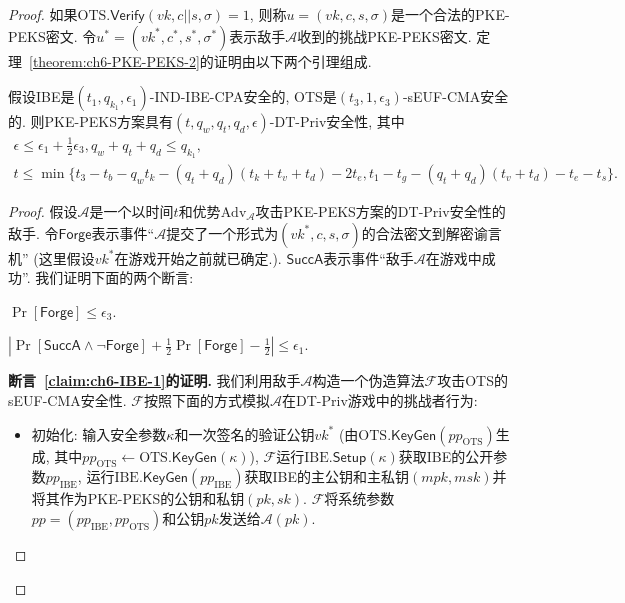 \begin{proof}
如果$\text{OTS}.\mathsf{Verify}(vk, c||s, \sigma) = 1$, 则称$u = (vk, c, s, \sigma)$是一个合法的PKE-PEKS密文. 令$u^* = (vk^*, c^*, s^*, \sigma^*)$表示敌手$\mathcal{A}$收到的挑战PKE-PEKS密文. 定理~\ref{theorem:ch6-PKE-PEKS-2}的证明由以下两个引理组成.
\begin{lemma}\label{lemma:ch6-IBE-1}
假设IBE是$(t_1, q_{k_1}, \epsilon_1)$-IND-IBE-CPA安全的, OTS是$(t_3, 1, \epsilon_3)$-sEUF-CMA安全的. 则PKE-PEKS方案具有$(t, q_w, q_t, q_d, \epsilon)$-DT-Priv安全性, 其中
\[ 
\begin{array}{l}
	\epsilon \leq \epsilon_1 + \frac{1}{2}\epsilon_3, q_w + q_t + q_d \leq q_{k_1},\\
	t \leq \min\{t_3 - t_b - q_wt_k - (q_t+q_d)(t_k+t_v+t_d) - 2t_e, t_1 - t_g - (q_t+q_d)(t_v+t_d) - t_e - t_s\}.
\end{array}
\]
\end{lemma}
\begin{proof}
假设$\mathcal{A}$是一个以时间$t$和优势$\text{Adv}_\mathcal{A}$攻击PKE-PEKS方案的DT-Priv安全性的敌手. 令$\mathsf{Forge}$表示事件``$\mathcal{A}$提交了一个形式为$(vk^*, c, s, \sigma)$的合法密文到解密谕言机'' (这里假设$vk^*$在游戏开始之前就已确定.). $\mathsf{SuccA}$表示事件``敌手$\mathcal{A}$在游戏中成功''. 我们证明下面的两个断言:
\begin{claim}\label{claim:ch6-IBE-1}
	$\Pr[\mathsf{Forge}] \leq \epsilon_3$.
\end{claim}

\begin{claim}\label{claim:ch6-IBE-2}
	$|\Pr[\mathsf{SuccA} \wedge \neg\mathsf{Forge}] + \frac{1}{2} \Pr[\mathsf{Forge}] - \frac{1}{2}| \leq \epsilon_1$.
\end{claim}  

\begin{trivlist}
	\item \textbf{断言~\ref{claim:ch6-IBE-1}的证明.} 我们利用敌手$\mathcal{A}$构造一个伪造算法$\mathcal{F}$攻击OTS的sEUF-CMA安全性. 	$\mathcal{F}$按照下面的方式模拟$\mathcal{A}$在DT-Priv游戏中的挑战者行为: 
\begin{itemize}
\item 初始化: 输入安全参数$\kappa$和一次签名的验证公钥$vk^*$ (由$\text{OTS}.\mathsf{KeyGen}(pp_{\text{OTS}})$生成, 其中$pp_{\text{OTS}} \leftarrow \text{OTS}.\mathsf{KeyGen}(\kappa)$), 
		$\mathcal{F}$运行$\text{IBE}.\mathsf{Setup}(\kappa)$获取IBE的公开参数$pp_{\text{IBE}}$, 运行$\text{IBE}.\mathsf{KeyGen}(pp_{\text{IBE}})$获取IBE的主公钥和主私钥$(mpk, msk)$并将其作为PKE-PEKS的公钥和私钥$(pk, sk)$. $\mathcal{F}$将系统参数$pp = (pp_{\text{IBE}}, pp_{\text{OTS}})$和公钥$pk$发送给$\mathcal{A}(pk)$. 


\end{itemize}
\end{trivlist}
\end{proof}
\end{proof}
